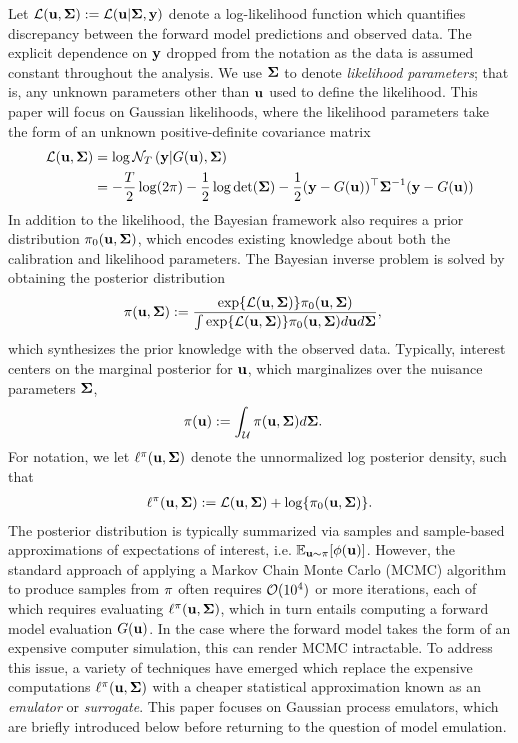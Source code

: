 \documentclass[12pt]{article}
\begin{document}
Let $\mathcal{L}(\mathbf{u}, \boldsymbol{\Sigma}) := \mathcal{L}(\mathbf{u} |\boldsymbol{\Sigma}, \mathbf{y})$ denote 
a log-likelihood function which quantifies discrepancy between the forward model predictions and observed data. The 
explicit dependence on $\mathbf{y}$ dropped from the notation as the data is assumed constant throughout the analysis. We use $\boldsymbol{\Sigma}$ to denote 
\textit{likelihood parameters}; that is, any unknown parameters other than $\mathbf{u}$ used to define the likelihood. This paper will focus on Gaussian likelihoods, 
where the likelihood parameters take the form of an unknown positive-definite covariance matrix 
\begin{align}
\mathcal{L}(\mathbf{u}, \boldsymbol{\Sigma}) &= \log \mathcal{N}_{T}\left(\mathbf{y} | G(\mathbf{u}), \boldsymbol{\Sigma} \right) \nonumber \\
			       &= -\frac{T}{2} \log(2\pi) - \frac{1}{2} \log \det(\boldsymbol{\Sigma}) - \frac{1}{2} (\mathbf{y} - G(\mathbf{u}))^\top \boldsymbol{\Sigma}^{-1} (\mathbf{y} - G(\mathbf{u})) \label{llik}
\end{align}
In addition to the likelihood, the Bayesian framework also requires a prior distribution $\pi_0(\mathbf{u}, \boldsymbol{\Sigma})$, 
which encodes existing knowledge about both the calibration and likelihood parameters. 
The Bayesian inverse problem is solved by obtaining the 
posterior distribution
\begin{align*}
\pi(\mathbf{u}, \boldsymbol{\Sigma}) &:= \frac{\exp\mathopen{}\left\{\mathcal{L}(\mathbf{u}, \boldsymbol{\Sigma})\right\}\mathclose{}\pi_0(\mathbf{u}, \boldsymbol{\Sigma})}{\int \exp\mathopen{}\left\{\mathcal{L}(\mathbf{u}, \boldsymbol{\Sigma})\right\}\mathclose{}\pi_0(\mathbf{u}, \boldsymbol{\Sigma}) d\mathbf{u} d\boldsymbol{\Sigma}},
\end{align*}
which synthesizes the prior knowledge with the observed data. Typically, interest centers on the marginal posterior for $\mathbf{u}$, which marginalizes over the nuisance 
parameters $\boldsymbol{\Sigma}$,
\begin{align*}
\pi(\mathbf{u}) &:= \int_{\mathcal{U}} \pi(\mathbf{u}, \boldsymbol{\Sigma}) d\boldsymbol{\Sigma}.
\end{align*}
For notation, we let $\ell^{\pi}(\mathbf{u}, \boldsymbol{\Sigma})$ denote the unnormalized log posterior density, such that 
\begin{align*}
\ell^{\pi}(\mathbf{u}, \boldsymbol{\Sigma}) := \mathcal{L}(\mathbf{u}, \boldsymbol{\Sigma}) + \log\mathopen{}\left\{\pi_0(\mathbf{u}, \boldsymbol{\Sigma})\right\}\mathclose{}.
\end{align*}
The posterior distribution is typically summarized via samples and sample-based approximations of expectations of interest, i.e. $\mathbb{E}_{\mathbf{u} \sim \pi}[\phi(\mathbf{u})]$.
However, the standard approach of applying a Markov Chain Monte Carlo (MCMC) algorithm to produce samples from $\pi$ often requires 
$\mathcal{O}(10^4)$ or more iterations, each of which requires evaluating $\ell^{\pi}(\mathbf{u}, \boldsymbol{\Sigma})$, which 
in turn entails computing a forward model evaluation $G(\mathbf{u})$. In the  case where the forward model takes the form of an expensive computer simulation, this 
can render MCMC intractable. To address this issue, a variety of techniques have emerged which replace the expensive computations 
$\ell^{\pi}(\mathbf{u}, \boldsymbol{\Sigma})$ with a cheaper statistical approximation known as an \textit{emulator} or \textit{surrogate}. This paper focuses on Gaussian process 
emulators, which are briefly introduced below before returning to the question of model emulation. 
\end{document}
